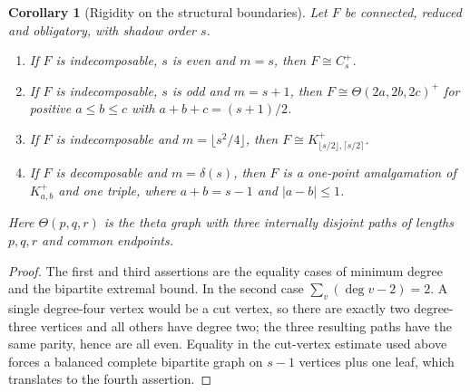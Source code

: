 \documentclass[a4paper,11pt,reqno]{amsart}
\theoremstyle{plain}
\newtheorem{corollary}[theorem]{Corollary}
\theoremstyle{definition}
\theoremstyle{remark}
\begin{document}
\begin{corollary}[Rigidity on the structural boundaries]
\label{corollary-structural-boundary-rigidity}
Let $F$ be connected, reduced and obligatory, with shadow order $s$.
\begin{enumerate}
\item If $F$ is indecomposable, $s$ is even and $m=s$, then
$F\cong C_s^+$.
\item If $F$ is indecomposable, $s$ is odd and $m=s+1$, then
$F\cong\Theta(2a,2b,2c)^+$ for positive $a\le b\le c$ with
$a+b+c=(s+1)/2$.
\item If $F$ is indecomposable and $m=\lfloor s^2/4\rfloor$, then
$F\cong K_{\lfloor s/2\rfloor,\lceil s/2\rceil}^+$.
\item If $F$ is decomposable and $m=\delta(s)$, then $F$ is a one-point
amalgamation of $K_{a,b}^+$ and one triple, where
$a+b=s-1$ and $|a-b|\le1$.
\end{enumerate}
Here $\Theta(p,q,r)$ is the theta graph with three internally disjoint paths
of lengths $p,q,r$ and common endpoints.
\end{corollary}
\begin{proof}
The first and third assertions are the equality cases of minimum degree and
the bipartite extremal bound.  In the second case
$\sum_v(\deg v-2)=2$.  A single degree-four vertex would be a cut vertex, so
there are exactly two degree-three vertices and all others have degree two;
the three resulting paths have the same parity, hence are all even.  Equality
in the cut-vertex estimate used above forces a balanced complete bipartite
graph on $s-1$ vertices plus one leaf, which translates to the fourth
assertion.
\end{proof}
\end{document}

